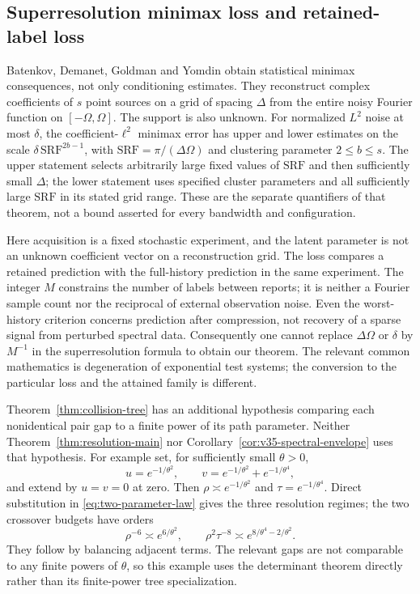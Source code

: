 \subsection{Superresolution minimax loss and retained-label loss}
Batenkov, Demanet, Goldman and Yomdin
\cite[Definition 3.13 and Theorem 3.14]{BDGY2020} obtain statistical
minimax consequences, not only conditioning estimates. They reconstruct
complex coefficients of $s$ point sources on a grid of spacing
$\Delta$ from the entire noisy Fourier function on $[-\Omega,\Omega]$.
The support is also unknown. For normalized $L^2$ noise at most
$\delta$, the coefficient-$\ell^2$
minimax error has upper and lower estimates on the scale
$\delta\,\mathrm{SRF}^{2b-1}$, with
$\mathrm{SRF}=\pi/(\Delta\Omega)$ and clustering parameter $2\le b\le s$.
The upper statement selects arbitrarily large fixed values of
$\mathrm{SRF}$ and then sufficiently small $\Delta$; the lower
statement uses specified cluster parameters and all sufficiently
large $\mathrm{SRF}$ in its stated grid range. These are the separate
quantifiers of that theorem, not a bound asserted for every bandwidth
and configuration.

Here acquisition is a fixed stochastic experiment, and the latent
parameter is not an unknown coefficient vector on a reconstruction
grid. The loss compares a retained prediction with the full-history
prediction in the same experiment. The integer $M$ constrains the
number of labels between reports; it is neither a Fourier sample
count nor the reciprocal of external observation noise. Even the
worst-history criterion concerns prediction after compression, not
recovery of a sparse signal from perturbed spectral data. Consequently
one cannot replace $\Delta\Omega$ or $\delta$ by $M^{-1}$ in the
superresolution formula to obtain our theorem. The relevant common
mathematics is degeneration of exponential test systems; the conversion
to the particular loss and the attained family is different.

\begin{remark}
\label{rem:v35-flat-path}
Theorem~\ref{thm:collision-tree} has an additional hypothesis comparing
each nonidentical pair gap to a finite power of its path parameter.
Neither Theorem~\ref{thm:resolution-main} nor
Corollary~\ref{cor:v35-spectral-envelope} uses that hypothesis.
For example set, for sufficiently small $\theta>0$,
\[
 u=e^{-1/\theta^2},\qquad
 v=e^{-1/\theta^2}+e^{-1/\theta^4},
\]
and extend by $u=v=0$ at zero. Then
$\rho\asymp e^{-1/\theta^2}$ and
$\tau=e^{-1/\theta^4}$. Direct substitution in
\eqref{eq:two-parameter-law} gives the three resolution regimes;
the two crossover budgets have orders
\[
 \rho^{-6}\asymp e^{6/\theta^2},\qquad
 \rho^2\tau^{-8}\asymp e^{8/\theta^4-2/\theta^2}.
\]
They follow by balancing adjacent terms. The relevant gaps are not
comparable to any finite powers of $\theta$, so this example uses
the determinant theorem directly rather than its finite-power tree
specialization.
\end{remark}
